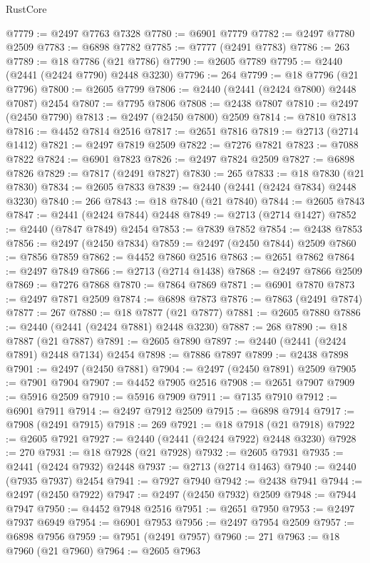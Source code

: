 \begin{lexlean}{RustCore}
\begin{coremodule}
@7779 := @2497 @7763 @7328
@7780 := @6901 @7779
@7782 := @2497 @7780 @2509
@7783 := @6898 @7782
@7785 := @7777 (@2491 @7783)
@7786 := 263
@7789 := @18 @7786 (@21 @7786)
@7790 := @2605 @7789
@7795 := @2440 (@2441 (@2424 @7790) @2448 @3230)
@7796 := 264
@7799 := @18 @7796 (@21 @7796)
@7800 := @2605 @7799
@7806 := @2440 (@2441 (@2424 @7800) @2448 @7087) @2454
@7807 := @7795 @7806
@7808 := @2438 @7807
@7810 := @2497 (@2450 @7790)
@7813 := @2497 (@2450 @7800) @2509
@7814 := @7810 @7813
@7816 := @4452 @7814 @2516
@7817 := @2651 @7816
@7819 := @2713 (@2714 @1412)
@7821 := @2497 @7819 @2509
@7822 := @7276 @7821
@7823 := @7088 @7822
@7824 := @6901 @7823
@7826 := @2497 @7824 @2509
@7827 := @6898 @7826
@7829 := @7817 (@2491 @7827)
@7830 := 265
@7833 := @18 @7830 (@21 @7830)
@7834 := @2605 @7833
@7839 := @2440 (@2441 (@2424 @7834) @2448 @3230)
@7840 := 266
@7843 := @18 @7840 (@21 @7840)
@7844 := @2605 @7843
@7847 := @2441 (@2424 @7844) @2448
@7849 := @2713 (@2714 @1427)
@7852 := @2440 (@7847 @7849) @2454
@7853 := @7839 @7852
@7854 := @2438 @7853
@7856 := @2497 (@2450 @7834)
@7859 := @2497 (@2450 @7844) @2509
@7860 := @7856 @7859
@7862 := @4452 @7860 @2516
@7863 := @2651 @7862
@7864 := @2497 @7849
@7866 := @2713 (@2714 @1438)
@7868 := @2497 @7866 @2509
@7869 := @7276 @7868
@7870 := @7864 @7869
@7871 := @6901 @7870
@7873 := @2497 @7871 @2509
@7874 := @6898 @7873
@7876 := @7863 (@2491 @7874)
@7877 := 267
@7880 := @18 @7877 (@21 @7877)
@7881 := @2605 @7880
@7886 := @2440 (@2441 (@2424 @7881) @2448 @3230)
@7887 := 268
@7890 := @18 @7887 (@21 @7887)
@7891 := @2605 @7890
@7897 := @2440 (@2441 (@2424 @7891) @2448 @7134) @2454
@7898 := @7886 @7897
@7899 := @2438 @7898
@7901 := @2497 (@2450 @7881)
@7904 := @2497 (@2450 @7891) @2509
@7905 := @7901 @7904
@7907 := @4452 @7905 @2516
@7908 := @2651 @7907
@7909 := @5916 @2509
@7910 := @5916 @7909
@7911 := @7135 @7910
@7912 := @6901 @7911
@7914 := @2497 @7912 @2509
@7915 := @6898 @7914
@7917 := @7908 (@2491 @7915)
@7918 := 269
@7921 := @18 @7918 (@21 @7918)
@7922 := @2605 @7921
@7927 := @2440 (@2441 (@2424 @7922) @2448 @3230)
@7928 := 270
@7931 := @18 @7928 (@21 @7928)
@7932 := @2605 @7931
@7935 := @2441 (@2424 @7932) @2448
@7937 := @2713 (@2714 @1463)
@7940 := @2440 (@7935 @7937) @2454
@7941 := @7927 @7940
@7942 := @2438 @7941
@7944 := @2497 (@2450 @7922)
@7947 := @2497 (@2450 @7932) @2509
@7948 := @7944 @7947
@7950 := @4452 @7948 @2516
@7951 := @2651 @7950
@7953 := @2497 @7937 @6949
@7954 := @6901 @7953
@7956 := @2497 @7954 @2509
@7957 := @6898 @7956
@7959 := @7951 (@2491 @7957)
@7960 := 271
@7963 := @18 @7960 (@21 @7960)
@7964 := @2605 @7963

\end{coremodule}
\end{lexlean}
